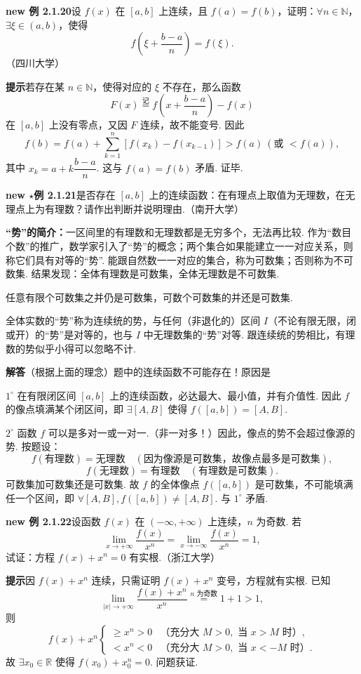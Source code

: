 \documentclass[UTF8,12pt,a4paper,fontset=fandol]{ctexart}
\begin{document}
\noindent\textbf{new 例 2.1.20}\quad 设 $f(x)$ 在 $[a,b]$ 上连续，且 $f(a)=f(b)$，证明：$\forall n\in\mathbb{N}$，$\exists\xi\in(a,b)$，使得
\[
  f\left(\xi+\frac{b-a}{n}\right)=f(\xi).
\]
（四川大学）

\noindent\textbf{提示}\quad 若存在某 $n\in\mathbb{N}$，使得对应的 $\xi$ 不存在，那么函数
\[
  F(x)\overset{\text{记}}=f\left(x+\frac{b-a}{n}\right)-f(x)
\]
在 $[a,b]$ 上没有零点，又因 $F$ 连续，故不能变号. 因此
\[
  f(b)=f(a)+\sum_{k=1}^{n}[f(x_k)-f(x_{k-1})]>f(a)\ (\text{或 }<f(a)),
\]
其中 $x_k=a+k\dfrac{b-a}{n}$. 这与 $f(a)=f(b)$ 矛盾. 证毕.

\noindent\textbf{new $\star$例 2.1.21}\quad 是否存在 $[a,b]$ 上的连续函数：在有理点上取值为无理数，在无理点上为有理数？请作出判断并说明理由.（南开大学）

\noindent\textbf{“势”的简介：}\quad 一区间里的有理数和无理数都是无穷多个，无法再比较. 作为“数目个数”的推广，数学家引入了“势”的概念；两个集合如果能建立一一对应关系，则称它们具有对等的“势”. 能跟自然数一一对应的集合，称为可数集；否则称为不可数集. 结果发现：全体有理数是可数集，全体无理数是不可数集.

任意有限个可数集之并仍是可数集，可数个可数集的并还是可数集.

全体实数的“势”称为连续统的势，与任何（非退化的）区间 $I$（不论有限无限，闭或开）的“势”是对等的，也与 $I$ 中无理数集的“势”对等. 跟连续统的势相比，有理数的势似乎小得可以忽略不计.

\noindent\textbf{解答}\quad （根据上面的理念）题中的连续函数不可能存在！原因是

$1^\circ$ 在有限闭区间 $[a,b]$ 上的连续函数，必达最大、最小值，并有介值性. 因此 $f$ 的像点填满某个闭区间，即 $\exists[A,B]$ 使得 $f([a,b])=[A,B]$.

$2^\circ$ 函数 $f$ 可以是多对一或一对一.（非一对多！）因此，像点的势不会超过像源的势. 按题设：
\[
  f(\text{有理数})=\text{无理数}\quad(\text{因为像源是可数集，故像点最多是可数集}),
\]
\[
  f(\text{无理数})=\text{有理数}\quad(\text{有理数是可数集}).
\]
可数集加可数集还是可数集. 故 $f$ 的全体像点 $f([a,b])$ 是可数集，不可能填满
任一个区间，即 $\forall[A,B],f([a,b])\ne[A,B]$. 与 $1^\circ$ 矛盾.

\noindent\textbf{new 例 2.1.22}\quad 设函数 $f(x)$ 在 $(-\infty,+\infty)$ 上连续，$n$ 为奇数. 若
\[
  \lim_{x\to+\infty}\frac{f(x)}{x^n}
  =
  \lim_{x\to-\infty}\frac{f(x)}{x^n}=1,
\]
试证：方程 $f(x)+x^n=0$ 有实根.（浙江大学）

\noindent\textbf{提示}\quad 因 $f(x)+x^n$ 连续，只需证明 $f(x)+x^n$ 变号，方程就有实根. 已知
\[
  \lim_{|x|\to+\infty}\frac{f(x)+x^n}{x^n}
  \overset{n\text{ 为奇数}}=1+1>1,
\]
则
\[
  f(x)+x^n
  \begin{cases}
    \ge x^n>0 & \text{（充分大 }M>0,\text{ 当 }x>M\text{ 时）},\\
    <x^n<0 & \text{（充分大 }M>0,\text{ 当 }x<-M\text{ 时）}.
  \end{cases}
\]
故 $\exists x_0\in\mathbb{R}$ 使得 $f(x_0)+x_0^n=0$. 问题获证.
\end{document}
